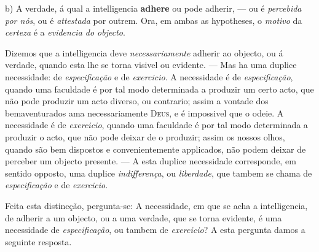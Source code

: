  b) A verdade, á qual a intelligencia \textbf{adhere} ou pode adherir, --- ou é \emph{percebida por nós}, ou é \emph{attestada} por outrem. Ora, em ambas as hypotheses, o \emph{motivo} da \emph{certeza} é a \emph{evidencia do objecto}.

Dizemos que a intelligencia deve \emph{necessariamente} adherir ao objecto, ou á verdade, quando esta lhe se torna visivel ou evidente. --- Mas ha uma duplice necessidade: de \emph{especificação} e de \emph{exercicio}. A necessidade é de \emph{especificação}, quando uma faculdade é por tal modo determinada a produzir um certo acto, que não pode produzir um acto diverso, ou contrario; assim a vontade dos bemaventurados ama necessariamente \textsc{Deus}, e é impossivel que o odeie. A necessidade é de \emph{exercicio}, quando uma faculdade é por tal modo determinada a produzir o acto, que não pode deixar de o produzir; assim os nossos olhos, quando são bem dispostos e convenientemente applicados, não podem deixar de perceber um objecto presente. --- A esta duplice necessidade corresponde, em sentido opposto, uma duplice \emph{indifferença}, ou \emph{liberdade}, que tambem se chama de \emph{especificação} e de \emph{exercicio}.

Feita esta distincção, pergunta-se: A necessidade, em que se acha a intelligencia, de adherir a um objecto, ou a uma verdade, que se torna evidente, é uma necessidade de \emph{especificação}, ou tambem de \emph{exercicio}? A esta pergunta damos a seguinte resposta.

